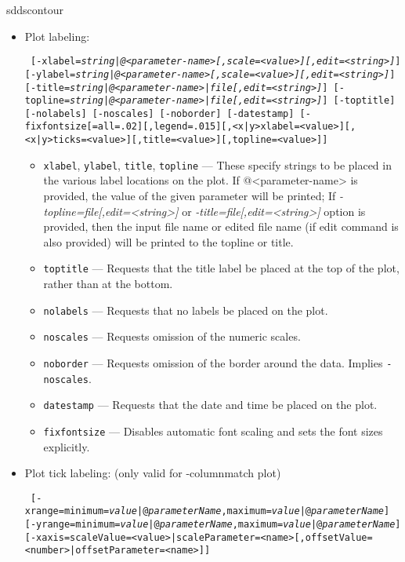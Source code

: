\begin{sddsprog}{sddscontour}
\begin{itemize}
    \item Plot labeling:
\begin{flushleft}{\tt
[-xlabel={\em string|@<parameter-name>[,scale=<value>][,edit=<string>]}]
[-ylabel={\em string|@<parameter-name>[,scale=<value>][,edit=<string>]}]
[-title={\em string|@<parameter-name>|file[,edit=<string>]}]
[-topline={\em string|@<parameter-name>|file[,edit=<string>]}]
[-toptitle] [-nolabels] [-noscales] [-noborder] [-datestamp]
[-fixfontsize[=all=.02][,legend=.015][,<x|y>xlabel=<value>][,<x|y>ticks=<value>][,title=<value>][,topline=<value>]]
}\end{flushleft}
        \begin{itemize}
        \item \verb|xlabel|, \verb|ylabel|, \verb|title|, \verb|topline| --- These specify strings to be placed
                in the various label locations on the plot. If @<parameter-name> is provided, the value of the
                given parameter will be printed; If {\em -topline=file[,edit=<string>]} or
                {\em -title=file[,edit=<string>]} option is provided, then the input file name or edited file
                name (if edit command is also provided) will be printed to the topline or title.
        \item \verb|toptitle| --- Requests that the title label be placed at the top of the plot, rather than
                at the bottom.
        \item \verb|nolabels| --- Requests that no labels be placed on the plot.
        \item \verb|noscales| --- Requests omission of the numeric scales.
        \item \verb|noborder| --- Requests omission of the border around the data.  Implies \verb|-noscales|.
        \item \verb|datestamp| --- Requests that the date and time be placed on the plot.
        \item \verb|fixfontsize| --- Disables automatic font scaling and sets the font sizes explicitly.
        \end{itemize}
    \item Plot tick labeling: (only valid for -columnmatch plot)
\begin{flushleft}{\tt
[-xrange=minimum={\em value}|@{\em parameterName},maximum={\em value}|@{\em parameterName}]
[-yrange=minimum={\em value}|@{\em parameterName},maximum={\em value}|@{\em parameterName}]
[-xaxis=scaleValue=<value>|scaleParameter=<name>[,offsetValue=<number>|offsetParameter=<name>]]
}
\end{flushleft}
\end{itemize}
\end{sddsprog}
